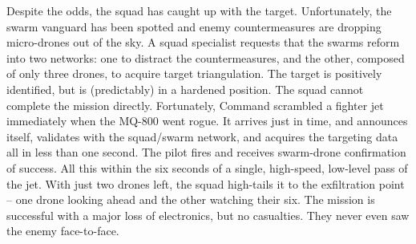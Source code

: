 Despite the odds, the squad has caught up with the target.
Unfortunately, the swarm vanguard has been spotted and enemy countermeasures are dropping micro-drones out of the sky.
A squad specialist requests that the swarms reform into two networks: one to distract the countermeasures, and the other, composed of only three drones, to acquire target triangulation.
The target is positively identified, but is (predictably) in a hardened position.
The squad cannot complete the mission directly.
Fortunately, Command scrambled a fighter jet immediately when the MQ-800 went rogue.
It arrives just in time, and announces itself, validates with the squad/swarm network, and acquires the targeting data all in less than one second.
The pilot fires and receives swarm-drone confirmation of success.
All this within the six seconds of a single, high-speed, low-level pass of the jet.
With just two drones left, the squad high-tails it to the exfiltration point -- one drone looking ahead and the other watching their six.
The mission is successful with a major loss of electronics, but no casualties.
They never even saw the enemy face-to-face.
